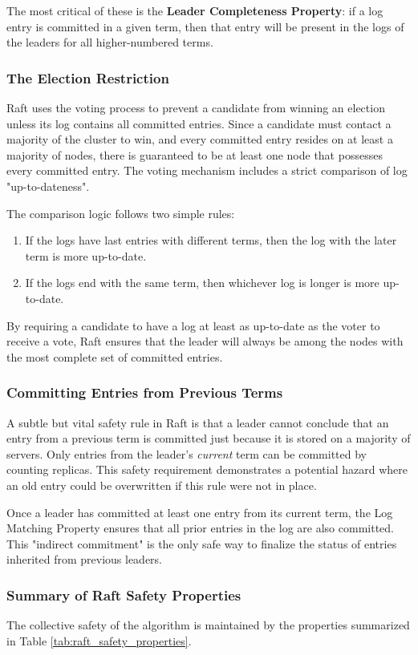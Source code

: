 The most critical of these is the \textbf{Leader Completeness Property}: if a log entry is committed in a given term, then that entry will be present in the logs of the leaders for all higher-numbered terms.

\subsubsection{The Election Restriction}
Raft uses the voting process to prevent a candidate from winning an election unless its log contains all committed entries.
Since a candidate must contact a majority of the cluster to win, and every committed entry resides on at least a majority of nodes, there is guaranteed to be at least one node that possesses every committed entry.
The voting mechanism includes a strict comparison of log "up-to-dateness".

The comparison logic follows two simple rules:
\begin{enumerate}
    \item If the logs have last entries with different terms, then the log with the later term is more up-to-date.
    \item If the logs end with the same term, then whichever log is longer is more up-to-date.
\end{enumerate}
By requiring a candidate to have a log at least as up-to-date as the voter to receive a vote, Raft ensures that the leader will always be among the nodes with the most complete set of committed entries.

\subsubsection{Committing Entries from Previous Terms}
A subtle but vital safety rule in Raft is that a leader cannot conclude that an entry from a previous term is committed just because it is stored on a majority of servers.
Only entries from the leader's \textit{current} term can be committed by counting replicas.
This safety requirement demonstrates a potential hazard where an old entry could be overwritten if this rule were not in place.

Once a leader has committed at least one entry from its current term, the Log Matching Property ensures that all prior entries in the log are also committed. This "indirect commitment" is the only safe way to finalize the status of entries inherited from previous leaders.

\subsubsection{Summary of Raft Safety Properties}
The collective safety of the algorithm is maintained by the properties summarized in Table \ref{tab:raft_safety_properties}.

